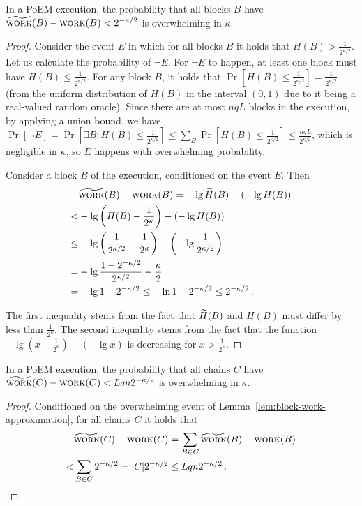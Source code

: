 \begin{lemma}\label{lem:block-work-approximation}
  In a PoEM execution, the probability that all blocks $B$
  have $\widetilde{\textsc{work}}(B) - \textsc{work}(B) < 2^{-\kappa/2}$
  is overwhelming in $\kappa$.
\end{lemma}
\begin{proof}
  Consider the event $E$ in which for all blocks $B$ it holds that
  $H(B) > \frac{1}{2^{\kappa/2}}$.
  Let us calculate the probability of $\lnot E$. For $\lnot E$ to happen,
  at least one block must have $H(B) \leq \frac{1}{2^{\kappa/2}}$.
  For any block $B$, it holds that $\Pr[H(B) \leq \frac{1}{2^{\kappa/2}}] = \frac{1}{2^{\kappa/2}}$ (from the
  uniform distribution of $H(B)$ in the interval $(0, 1)$ due to it being a real-valued random oracle).
  Since there are at most $nqL$ blocks in the execution, by applying a union bound, we have
  $\Pr[\lnot E] = \Pr[\exists B: H(B) \leq \frac{1}{2^{\kappa/2}}] \leq \sum_B \Pr[H(B) \leq \frac{1}{2^{\kappa/2}}] \leq \frac{nqL}{2^{\kappa/2}}$,
  which is negligible in $\kappa$,
  so $E$ happens with overwhelming probability.

  Consider a block $B$ of the execution, conditioned on the event $E$.
  Then
  \begin{align*}
        &\widetilde{\textsc{work}}(B) - \textsc{work}(B) = -\lg \widetilde{H}(B) - (-\lg H(B))\\
       <& -\lg\left(H(B) - \frac{1}{2^\kappa}\right) - (-\lg H(B))\\
    \leq& -\lg\left(\frac{1}{2^{\kappa/2}} - \frac{1}{2^\kappa}\right) - \left(-\lg{\frac{1}{2^{\kappa/2}}}\right)\\
       =& -\lg\frac{1 - 2^{-\kappa/2}}{2^{\kappa/2}} - \frac{\kappa}{2} \\
       =& -\lg{1 - 2^{-\kappa/2}} \leq -\ln{1 - 2^{-\kappa/2}} \leq 2^{-\kappa/2}\,.
  \end{align*}

  The first inequality stems from the fact that $\widetilde{H}(B)$ and $H(B)$ must
  differ by less than $\frac{1}{2^\kappa}$. The second inequality stems from
  the fact that the function $-\lg\left(x - \frac{1}{2^\kappa}\right) - (-\lg x)$ is
  decreasing for $x > \frac{1}{2^\kappa}$.
  \Qed
\end{proof}

\begin{corollary}\label{cor:chain-work-approximation}
  In a PoEM execution, the probability that all chains $C$
  have $\widetilde{\textsc{work}}(C) - \textsc{work}(C) < Lqn 2^{-\kappa/2}$
  is overwhelming in $\kappa$.
\end{corollary}
\begin{proof}
  Conditioned on the overwhelming event of Lemma~\ref{lem:block-work-approximation}, for all
  chains $C$ it holds that
  \begin{align*}
     &\widetilde{\textsc{work}}(C) - \textsc{work}(C) = \sum_{B \in C}{\widetilde{\textsc{work}}(B) - \textsc{work}(B)}\\
    <& \sum_{B \in C}{2^{-\kappa/2}} = |C| 2^{-\kappa/2} \leq Lqn 2^{-\kappa/2}\,.
  \end{align*}
  \Qed
\end{proof}

